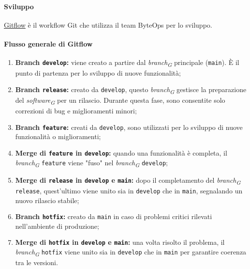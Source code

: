 \paragraph{Sviluppo}
\href{https://www.atlassian.com/it/git/tutorials/comparing-workflows/gitflow-workflow}{Gitflow} è il workflow Git che utilizza il team ByteOps per lo sviluppo.

\paragraph*{Flusso generale di Gitflow}

\begin{enumerate}
    \item \textbf{Branch \texttt{develop}:} viene creato a partire dal \textit{branch}\textsubscript{\textit{G}} principale (\texttt{main}). È il punto di partenza per lo sviluppo di nuove funzionalità;

    \item \textbf{Branch \texttt{release}:} creato da \texttt{develop}, questo \textit{branch}\textsubscript{\textit{G}} gestisce la preparazione del \textit{software}\textsubscript{\textit{G}} per un rilascio. Durante questa fase, sono consentite solo correzioni di bug e miglioramenti minori;

    \item \textbf{Branch \texttt{feature}:} creati da \texttt{develop}, sono utilizzati per lo sviluppo di nuove funzionalità o miglioramenti; 

    \item \textbf{Merge di \texttt{feature} in \texttt{develop}:} quando una funzionalità è completa, il \textit{branch}\textsubscript{\textit{G}} \texttt{feature} viene "fuso" nel \textit{branch}\textsubscript{\textit{G}} \texttt{develop};

    \item \textbf{Merge di \texttt{release} in \texttt{develop} e \texttt{main}:} dopo il completamento del \textit{branch}\textsubscript{\textit{G}} \texttt{release}, quest'ultimo viene unito sia in \texttt{develop} che in \texttt{main}, segnalando un nuovo rilascio stabile;

    \item \textbf{Branch \texttt{hotfix}:} creato da \texttt{main} in caso di problemi critici rilevati nell'ambiente di produzione;

    \item \textbf{Merge di \texttt{hotfix} in \texttt{develop} e \texttt{main}:} una volta risolto il problema, il \textit{branch}\textsubscript{\textit{G}} \texttt{hotfix} viene unito sia in \texttt{develop} che in \texttt{main} per garantire coerenza tra le versioni.
\end{enumerate}

